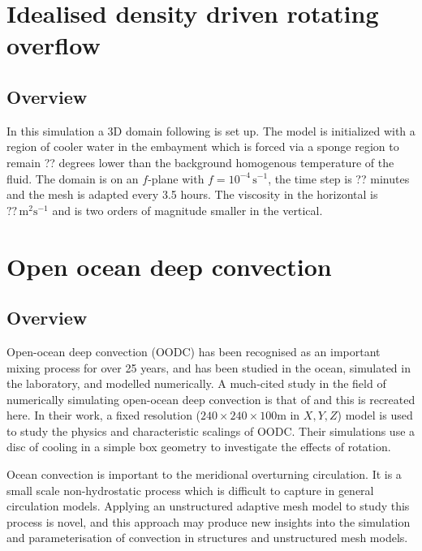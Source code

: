 

\section{Idealised density driven rotating overflow}
\label{sect:DOME}
\subsection{Overview}
In this simulation a 3D domain following \cite{DOME} is set
up. The model is initialized with a region of cooler water in the
embayment which is forced via a sponge region to remain ?? degrees
lower than the background homogenous temperature of the fluid.  The
domain is on an $f$-plane with $f=10^{-4}\,\textrm{s}^{-1}$, the time step is ??
minutes and the mesh is adapted every 3.5 hours. The viscosity in the
horizontal is $??\,\textrm{m}^{2}\textrm{s}^{-1}$ and is two orders of magnitude smaller
in the vertical. 



\section{Open ocean deep convection}
\label{sect:OODC}
\subsection{Overview}
Open-ocean deep convection (OODC) has been recognised as an
important mixing process for over 25 years, and
has been studied in the ocean, simulated in the laboratory, and modelled numerically.
A much-cited study in the field of numerically simulating
open-ocean deep convection is that of \cite{jones1993} and this is recreated here.
In their work, a fixed resolution ($240 \times 240 \times
100$m in $X, Y, Z$) model is used to study the physics and
characteristic scalings of OODC. Their simulations use a disc
of cooling in a simple box geometry to investigate the effects of rotation.

Ocean convection is important to the meridional overturning
circulation. It is a small scale non-hydrostatic process which
is difficult to capture in general circulation models. Applying
an unstructured adaptive mesh model to study this process is
novel, and this approach may produce new insights into the
simulation and parameterisation of convection in structures and
unstructured mesh models.

